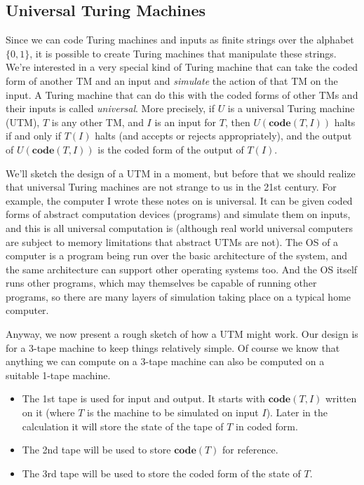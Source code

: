 \documentclass{article}
\theoremstyle{plain}
\theoremstyle{definition}
\newcommand{\co}{\mathbf{code}}
\begin{document}
\subsection{Universal Turing Machines}
Since we can code Turing machines and inputs as finite strings over the alphabet $\{0,1\}$, it is possible to create Turing machines that manipulate these strings. We're interested in a very special kind of Turing machine that can take the coded form of another TM and an input and \emph{simulate} the action of that TM on the input. A Turing machine that can do this with the coded forms of other TMs and their inputs is called \emph{universal}. More precisely, if $U$ is a universal Turing machine (UTM), $T$ is any other TM, and $I$ is an input for $T$, then $U(\co(T,I))$ halts if and only if $T(I)$ halts (and accepts or rejects appropriately), and the output of $U(\co(T,I))$ is the coded form of the output of $T(I)$.

We'll sketch the design of a UTM in a moment, but before that we should realize that universal Turing machines are not strange to us in the 21st century. For example, the computer I wrote these notes on is universal. It can be given coded forms of abstract computation devices (programs) and simulate them on inputs, and this is all universal computation is (although real world universal computers are subject to memory limitations that abstract UTMs are not). The OS of a computer is a program being run over the basic architecture of the system, and the same architecture can support other operating systems too. And the OS itself runs other programs, which may themselves be capable of running other programs, so there are many layers of simulation taking place on a typical home computer.  

Anyway, we now present a rough sketch of how a UTM might work. Our design is for a 3-tape machine to keep things relatively simple. Of course we know that anything we can compute on a 3-tape machine can also be computed on a suitable 1-tape machine.

\begin{itemize}
\item The 1st tape is used for input and output. It starts with $\co(T,I)$ written on it (where $T$ is the machine to be simulated on input $I$). Later in the calculation it will store the state of the tape of $T$ in coded form.
\item The 2nd tape will be used to store $\co(T)$ for reference.
\item The 3rd tape will be used to store the coded form of the state of $T$.
\end{itemize} 
\end{document}
